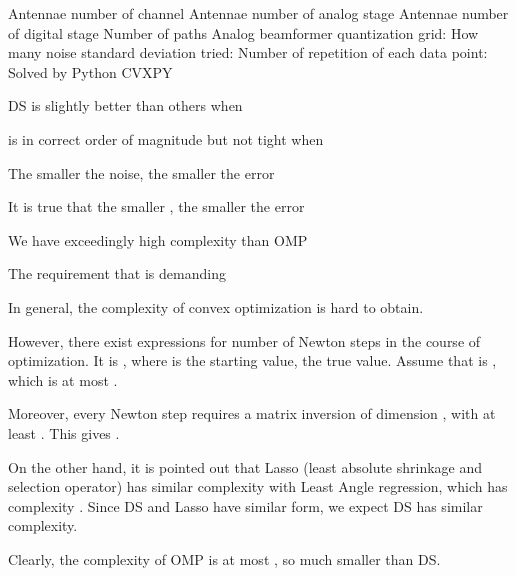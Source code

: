 {
\I Antennae number of channel 
\I Antennae number of analog stage 
\I Antennae number of digital stage 
\I Number of paths 
\I Analog beamformer quantization grid: 
\I How many noise standard deviation tried: 
\I Number of repetition of each data point: 
\I Solved by Python CVXPY
}
{
\blank [big]
}
{
\blank [big]
}
{
\blank [big]
}
{
\blank [big]
}
{
\blank [big]
}
{
\blank [big]
}
{
\I DS is slightly better than others when 

\I {} is in correct order of magnitude but not tight when 

\I The smaller the noise, the smaller the error

\I It is  true that the smaller , the smaller the error

\I We have exceedingly high complexity than OMP

\I The requirement that  is demanding
}
{
\I In general, the complexity of convex optimization is hard to obtain.

\I However, there exist expressions for number of Newton steps in the course of optimization.
It is , where  is the starting value,  the true value.
Assume that is , which is at most .

\I Moreover, every Newton step requires a matrix inversion of dimension , with at least .
This gives .
}
{
\I On the other hand, it is pointed out that Lasso (least absolute shrinkage and selection operator) has similar complexity with Least Angle regression, which has complexity .
Since DS and Lasso have similar form, we expect DS has similar complexity.

\I Clearly, the complexity of OMP is at most , so much smaller than DS.
}


